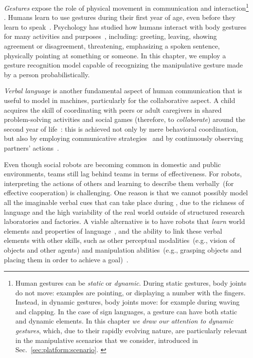 \emph{Gestures} expose the role of physical movement in communication and interaction\footnote{%
Human gestures can be \emph{static} or \emph{dynamic}.
During static gestures, body joints do not move: examples are pointing, or displaying a number with the fingers.
Instead, in dynamic gestures, body joints move: for example during waving and clapping.
In the case of sign languages, a gesture can have both static and dynamic elements.
In this chapter \emph{we draw our attention to dynamic gestures}, which, due to their rapidly evolving nature, are particularly relevant in the manipulative scenarios that we consider, introduced in Sec.~\ref{sec:platform:scenario}. \label{footnote:static_dynamic_gestures}}%
.
Humans learn to use gestures during their first year of age, even before they learn to speak~\cite{tomasello:2007:cd}.
Psychology has studied how humans interact with body gestures for many activities and purposes~\cite{mcneill:1996,messing:1999}, including: greeting, leaving, showing agreement or disagreement, threatening, emphasizing a spoken sentence, physically pointing at something or someone.
In this chapter, we employ a gesture recognition model capable of recognizing the manipulative gesture made by a person probabilistically.

\emph{Verbal language} is another fundamental aspect of human communication that is useful to model in machines, particularly for the collaborative aspect.
A child acquires the skill of coordinating with peers or adult caregivers in shared problem-solving activities and social games (therefore, to \emph{collaborate}) around the second year of life~\cite{brownell:2006:childdev}: this is achieved not only by mere behavioral coordination, but also by employing communicative strategies~\cite{melis:2010:rstb} and by continuously observing partners' actions~\cite{ramnani:2004:natureneuro}.

Even though social robots
are becoming common in domestic and public environments, \hr{} teams still lag behind \hh{} teams in terms of effectiveness.
For robots, interpreting the actions of others and learning to describe them verbally~(for effective cooperation) is challenging.
One reason is that we cannot possibly model all the imaginable verbal cues that can take place during \hri, due to the richness of language and the high variability of the real world outside of structured research laboratories and factories.
A viable alternative is to have robots that \emph{learn} world elements and properties of language~\cite{iwahashi:2007:hri}, and the ability to link these verbal elements with other skills, such as other perceptual modalities~(e.g., vision of objects and other agents) and manipulation abilities~(e.g., grasping objects and placing them in order to achieve a goal)~\cite{steels:2003:trendscogsci}.

